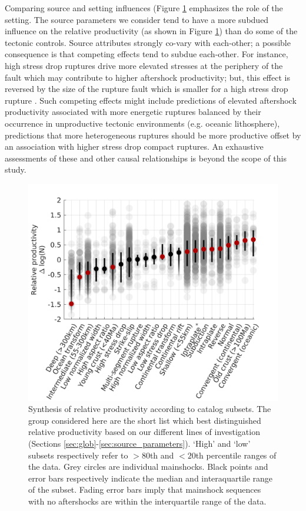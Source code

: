\documentclass[draft]{agujournal2018}
\begin{document}
Comparing source and setting influences (Figure \ref{fig:caltech} emphasizes the role of the setting. The source parameters we consider tend to have a more subdued influence on the relative productivity (as shown in Figure \ref{fig:caltech}) than do some of the tectonic controls. Source attributes strongly co-vary with each-other; a possible consequence is that competing effects tend to subdue each-other. For instance, high stress drop ruptures drive more elevated stresses at the periphery of the fault which may contribute to higher aftershock productivity; but, this effect is reversed by the size of the rupture fault which is smaller for a high stress drop rupture \cite{Scholz2019}. Such competing effects might include predictions of elevated aftershock productivity associated with more energetic ruptures balanced by their occurrence in unproductive tectonic environments (e.g. oceanic lithosphere), predictions that more heterogeneous ruptures should be more productive offset by an association with higher stress drop compact ruptures. An exhaustive assessments of these and other causal relationships is beyond the scope of this study.
   
 \begin{figure}
        \centering
        \includegraphics{figures/cal_tech.png}
        \caption{Synthesis of relative productivity according to catalog subsets. The group considered here are the short list which best distinguished relative productivity based on our different lines of investigation (Sections \ref{sec:glob}-\ref{sec:source_parameters}). `High' and `low' subsets respectively refer to $>80$th and $<20$th percentile ranges of the data. Grey circles are individual mainshocks. Black points and error bars respectively indicate the median and interaquartile range of the subset. Fading error bars imply that mainshock sequences with no aftershocks are within the interquartile range of the data.}
        \label{fig:caltech}
    \end{figure}   
    
\end{document}
